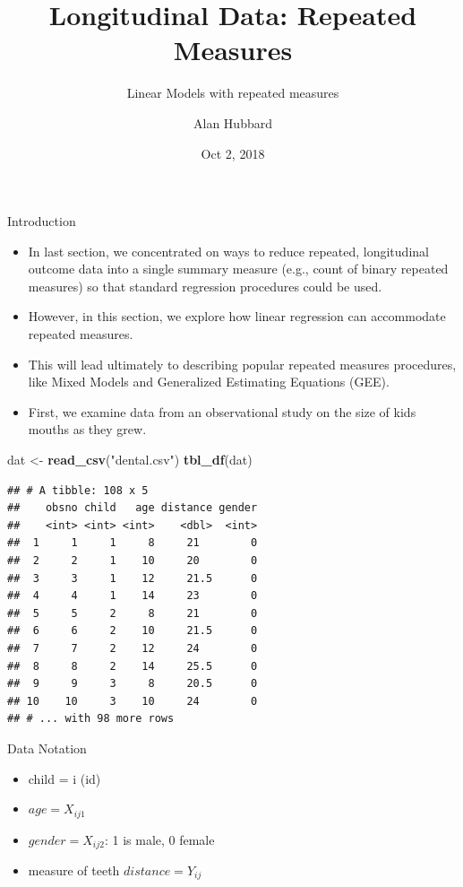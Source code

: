 \documentclass[ignorenonframetext,]{beamer}
\title{Longitudinal Data: Repeated Measures}
\subtitle{Linear Models with repeated measures}
\author{Alan Hubbard}
\date{Oct 2, 2018}
\newenvironment{Shaded}{\begin{snugshade}}{\end{snugshade}}
\newcommand{\KeywordTok}[1]{\textcolor[rgb]{0.13,0.29,0.53}{\textbf{#1}}}
\newcommand{\StringTok}[1]{\textcolor[rgb]{0.31,0.60,0.02}{#1}}
\newcommand{\NormalTok}[1]{#1}
\providecommand{\tightlist}{%
  \setlength{\itemsep}{0pt}\setlength{\parskip}{0pt}}
\begin{document}
\frame{\titlepage}

\begin{frame}{Introduction}

\begin{itemize}
\tightlist
\item
  In last section, we concentrated on ways to reduce repeated,
  longitudinal outcome data into a single summary measure (e.g., count
  of binary repeated measures) so that standard regression procedures
  could be used.
\item
  However, in this section, we explore how linear regression can
  accommodate repeated measures.
\item
  This will lead ultimately to describing popular repeated measures
  procedures, like Mixed Models and Generalized Estimating Equations
  (GEE).
\item
  First, we examine data from an observational study on the size of kids
  mouths as they grew.
\end{itemize}

\end{frame}

\begin{frame}[fragile]

\begin{Shaded}
\begin{Highlighting}[]
\NormalTok{dat <-}\StringTok{ }\KeywordTok{read_csv}\NormalTok{(}\StringTok{"dental.csv"}\NormalTok{)}
\KeywordTok{tbl_df}\NormalTok{(dat)}
\end{Highlighting}
\end{Shaded}

\begin{verbatim}
## # A tibble: 108 x 5
##    obsno child   age distance gender
##    <int> <int> <int>    <dbl>  <int>
##  1     1     1     8     21        0
##  2     2     1    10     20        0
##  3     3     1    12     21.5      0
##  4     4     1    14     23        0
##  5     5     2     8     21        0
##  6     6     2    10     21.5      0
##  7     7     2    12     24        0
##  8     8     2    14     25.5      0
##  9     9     3     8     20.5      0
## 10    10     3    10     24        0
## # ... with 98 more rows
\end{verbatim}

\end{frame}

\begin{frame}{Data Notation}

\begin{itemize}
\tightlist
\item
  child = i (id)
\item
  \(age = X_{ij1}\)
\item
  \(gender = X_{ij2}\): 1 is male, 0 female
\item
  measure of teeth \(distance = Y_{ij}\)
\end{itemize}

\end{frame}
\end{document}
